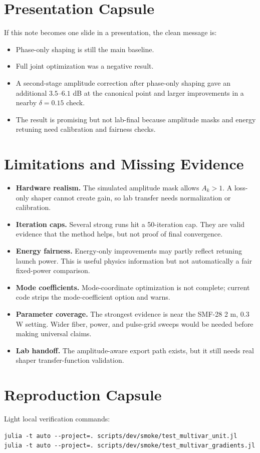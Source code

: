 \documentclass[11pt]{article}
\newcommand{\Avar}{A}
\begin{document}
\section{Presentation Capsule}
If this note becomes one slide in a presentation, the clean message is:
\begin{itemize}
    \item Phase-only shaping is still the main baseline.
    \item Full joint optimization was a negative result.
    \item A second-stage amplitude correction after phase-only shaping gave an additional $3.5$--$6.1$ dB at the canonical point and larger improvements in a nearby $\delta=0.15$ check.
    \item The result is promising but not lab-final because amplitude masks and energy retuning need calibration and fairness checks.
\end{itemize}

\section{Limitations and Missing Evidence}
\begin{itemize}
    \item \textbf{Hardware realism.} The simulated amplitude mask allows $\Avar_k>1$. A loss-only shaper cannot create gain, so lab transfer needs normalization or calibration.
    \item \textbf{Iteration caps.} Several strong runs hit a 50-iteration cap. They are valid evidence that the method helps, but not proof of final convergence.
    \item \textbf{Energy fairness.} Energy-only improvements may partly reflect retuning launch power. This is useful physics information but not automatically a fair fixed-power comparison.
    \item \textbf{Mode coefficients.} Mode-coordinate optimization is not complete; current code strips the mode-coefficient option and warns.
    \item \textbf{Parameter coverage.} The strongest evidence is near the SMF-28 2 m, 0.3 W setting. Wider fiber, power, and pulse-grid sweeps would be needed before making universal claims.
    \item \textbf{Lab handoff.} The amplitude-aware export path exists, but it still needs real shaper transfer-function validation.
\end{itemize}

\section{Reproduction Capsule}
Light local verification commands:
\begin{verbatim}
julia -t auto --project=. scripts/dev/smoke/test_multivar_unit.jl
julia -t auto --project=. scripts/dev/smoke/test_multivar_gradients.jl
\end{verbatim}
\end{document}
